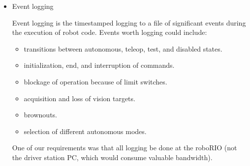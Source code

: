 \documentclass[]{article}
\begin{document}
\begin{itemize}[topsep=0pt]
	
\item Event logging

Event logging is the timestamped logging to a file of significant events during the execution of robot code.
Events worth logging could include:
\begin{itemize}[noitemsep,topsep=0pt]
\item transitions between autonomous, teleop, test, and disabled states.
\item initialization, end, and interruption of commands.
\item blockage of operation because of limit switches.
\item acquisition and loss of vision targets.
\item brownouts.
\item selection of different autonomous modes.
\end{itemize}

One of our requirements was that all logging be done at the roboRIO (not the driver station PC, which would consume valuable bandwidth).


\end{itemize}
\end{document}
